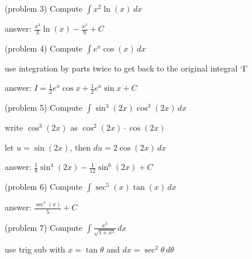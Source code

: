 \documentclass[handout]{ximera}
\begin{document}
\begin{problem}(problem 3)
Compute $\displaystyle \int x^2\ln(x) \, dx$

\begin{hint}
answer: $\displaystyle \frac{x^3}{3} \ln(x) - \frac{x^3}{9} + C$
\end{hint}

\end{problem}


\begin{problem}(problem 4)
Compute $\displaystyle \int e^x \cos(x) \, dx$

\begin{hint}
use integration by parts twice to get back to the original integral `I'
\end{hint}

\begin{hint}
answer: $I = \frac12 e^x \cos x + \frac12 e^x \sin x + C$
\end{hint}

\end{problem}


\begin{problem}(problem 5)
Compute $\displaystyle \int \sin^3(2x) \cos^3(2x) \, dx$

\begin{hint}
write $\cos^3(2x)$ as $\cos^2(2x) \cdot \cos(2x)$
\end{hint}

\begin{hint}
let $u = \sin(2x)$, then $du = 2\cos(2x) \, dx$
\end{hint}

\begin{hint}
answer: $\displaystyle \frac18 \sin^4 (2x) - \frac{1}{12} \sin^6 (2x) + C$
\end{hint}

\end{problem}


\begin{problem}(problem 6)
Compute $\displaystyle \int \sec^5(x) \tan(x)  \, dx$

\begin{hint}
answer: $\displaystyle \frac{\sec^5(x)}{5} + C$
\end{hint}

\end{problem}


\begin{problem}(problem 7)
Compute $\displaystyle \int \frac{x^3}{ \sqrt{1+x^2}} \, dx$

\begin{hint}
use trig sub with $x = \tan \theta$ and $dx =  \sec^2 \theta \, d\theta$
\end{hint}

\end{problem}
\end{document}
